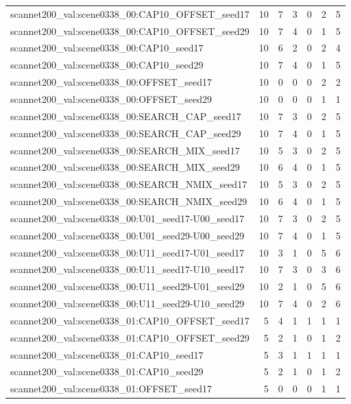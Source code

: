 \begin{table}[t]
\begin{tabular}{lrrrrrr}
scannet200\_val:scene0338\_00:CAP10\_OFFSET\_seed17 & 10 & 7 & 3 & 0 & 2 & 5 \\
scannet200\_val:scene0338\_00:CAP10\_OFFSET\_seed29 & 10 & 7 & 4 & 0 & 1 & 5 \\
scannet200\_val:scene0338\_00:CAP10\_seed17 & 10 & 6 & 2 & 0 & 2 & 4 \\
scannet200\_val:scene0338\_00:CAP10\_seed29 & 10 & 7 & 4 & 0 & 1 & 5 \\
scannet200\_val:scene0338\_00:OFFSET\_seed17 & 10 & 0 & 0 & 0 & 2 & 2 \\
scannet200\_val:scene0338\_00:OFFSET\_seed29 & 10 & 0 & 0 & 0 & 1 & 1 \\
scannet200\_val:scene0338\_00:SEARCH\_CAP\_seed17 & 10 & 7 & 3 & 0 & 2 & 5 \\
scannet200\_val:scene0338\_00:SEARCH\_CAP\_seed29 & 10 & 7 & 4 & 0 & 1 & 5 \\
scannet200\_val:scene0338\_00:SEARCH\_MIX\_seed17 & 10 & 5 & 3 & 0 & 2 & 5 \\
scannet200\_val:scene0338\_00:SEARCH\_MIX\_seed29 & 10 & 6 & 4 & 0 & 1 & 5 \\
scannet200\_val:scene0338\_00:SEARCH\_NMIX\_seed17 & 10 & 5 & 3 & 0 & 2 & 5 \\
scannet200\_val:scene0338\_00:SEARCH\_NMIX\_seed29 & 10 & 6 & 4 & 0 & 1 & 5 \\
scannet200\_val:scene0338\_00:U01\_seed17-U00\_seed17 & 10 & 7 & 3 & 0 & 2 & 5 \\
scannet200\_val:scene0338\_00:U01\_seed29-U00\_seed29 & 10 & 7 & 4 & 0 & 1 & 5 \\
scannet200\_val:scene0338\_00:U11\_seed17-U01\_seed17 & 10 & 3 & 1 & 0 & 5 & 6 \\
scannet200\_val:scene0338\_00:U11\_seed17-U10\_seed17 & 10 & 7 & 3 & 0 & 3 & 6 \\
scannet200\_val:scene0338\_00:U11\_seed29-U01\_seed29 & 10 & 2 & 1 & 0 & 5 & 6 \\
scannet200\_val:scene0338\_00:U11\_seed29-U10\_seed29 & 10 & 7 & 4 & 0 & 2 & 6 \\
scannet200\_val:scene0338\_01:CAP10\_OFFSET\_seed17 & 5 & 4 & 1 & 1 & 1 & 1 \\
scannet200\_val:scene0338\_01:CAP10\_OFFSET\_seed29 & 5 & 2 & 1 & 0 & 1 & 2 \\
scannet200\_val:scene0338\_01:CAP10\_seed17 & 5 & 3 & 1 & 1 & 1 & 1 \\
scannet200\_val:scene0338\_01:CAP10\_seed29 & 5 & 2 & 1 & 0 & 1 & 2 \\
scannet200\_val:scene0338\_01:OFFSET\_seed17 & 5 & 0 & 0 & 0 & 1 & 1 \\

\end{tabular}
\end{table}

